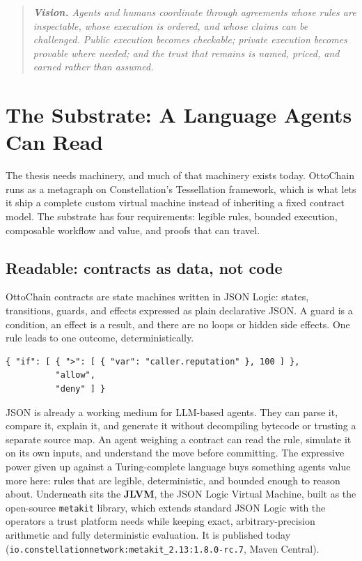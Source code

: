 \documentclass[11pt,a4paper]{article}
\newenvironment{pullquote}
  {\begin{quote}\itshape\color{codetext}}
  {\end{quote}}
\begin{document}
\begin{pullquote}
\textbf{Vision.} Agents and humans coordinate through agreements whose rules are inspectable, whose execution is ordered, and whose claims can be challenged. Public execution becomes checkable; private execution becomes provable where needed; and the trust that remains is named, priced, and earned rather than assumed.
\end{pullquote}

\section{The Substrate: A Language Agents Can Read}

The thesis needs machinery, and much of that machinery exists today. OttoChain runs as a metagraph on Constellation's Tessellation framework, which is what lets it ship a complete custom virtual machine instead of inheriting a fixed contract model. The substrate has four requirements: legible rules, bounded execution, composable workflow and value, and proofs that can travel.

\subsection{Readable: contracts as data, not code}

OttoChain contracts are state machines written in JSON Logic: states, transitions, guards, and effects expressed as plain declarative JSON. A guard is a condition, an effect is a result, and there are no loops or hidden side effects. One rule leads to one outcome, deterministically.

\begin{lstlisting}
{ "if": [ { ">": [ { "var": "caller.reputation" }, 100 ] },
          "allow",
          "deny" ] }
\end{lstlisting}

JSON is already a working medium for LLM-based agents. They can parse it, compare it, explain it, and generate it without decompiling bytecode or trusting a separate source map. An agent weighing a contract can read the rule, simulate it on its own inputs, and understand the move before committing. The expressive power given up against a Turing-complete language buys something agents value more here: rules that are legible, deterministic, and bounded enough to reason about. Underneath sits the \textbf{JLVM}, the JSON Logic Virtual Machine, built as the open-source \texttt{metakit} library, which extends standard JSON Logic with the operators a trust platform needs while keeping exact, arbitrary-precision arithmetic and fully deterministic evaluation. It is published today (\texttt{io.constellationnetwork:metakit\_2.13:1.8.0-rc.7}, Maven Central).
\end{document}
